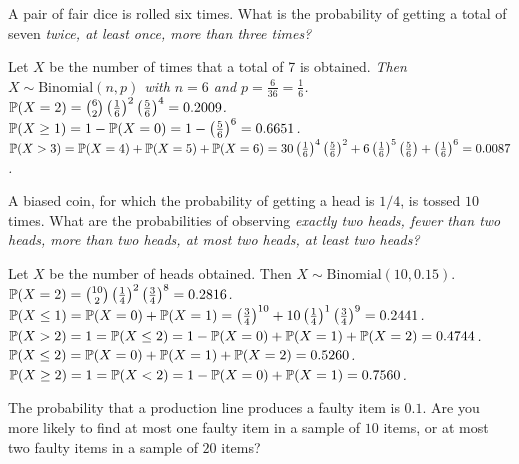 \begin{exercise}
\begin{questions}
\question
A pair of fair dice is rolled six times. What is the probability of getting a total of seven
\ben
\it twice,
\it at least once,
\it more than three times?
\een
\begin{answer}
Let $X$ be the number of times that a total of 7 is obtained. 
\bit
\it Then $X\sim\text{Binomial}(n,p)$ with $n=6$ and $p=\frac{6}{36}=\frac{1}{6}$.
\eit
\ben
\it $\mathbb{P}(X=2) 
	= \binom{6}{2}\left(\frac{1}{6}\right)^2 \left(\frac{5}{6}\right)^4 
	= 0.2009$.
\it $\mathbb{P}(X\geq 1) 
	= 1 - \mathbb{P}(X=0) 
	= 1 - \left(\frac{5}{6}\right)^6 
	= 0.6651$.
\it $\mathbb{P}(X>3)
	= \mathbb{P}(X=4) + \mathbb{P}(X=5) +\mathbb{P}(X=6)
	= 30\left(\frac{1}{6}\right)^4 \left(\frac{5}{6}\right)^2
		+ 6\left(\frac{1}{6}\right)^5 \left(\frac{5}{6}\right) 
		+ \left(\frac{1}{6}\right)^6 
	= 0.0087$.
\een
\end{answer}

\question
A biased coin, for which the probability of getting a head is $1/4$, is tossed $10$ times. What are the probabilities of observing
\ben
\it exactly two heads,
\it fewer than two heads,
\it more than two heads,
\it at most two heads, 
\it at least two heads?
\een
\begin{answer}
Let $X$ be the number of heads obtained. Then $X\sim\text{Binomial}(10,0.15)$. 
\ben
\it $\mathbb{P}(X=2) 
	= \binom{10}{2}\left(\frac{1}{4}\right)^2 \left(\frac{3}{4}\right)^8 
	= 0.2816$.
\it $\mathbb{P}(X\leq 1) 
	= \mathbb{P}(X=0) + \mathbb{P}(X=1) 
	= \left(\frac{3}{4}\right)^{10} + 10\left(\frac{1}{4}\right)^1 \left(\frac{3}{4}\right)^9 
	= 0.2441$.
\it $\mathbb{P}(X>2)
	= 1 = \mathbb{P}(X\leq 2)
	= 1 - \mathbb{P}(X=0) + \mathbb{P}(X=1) +\mathbb{P}(X=2)
	= 0.4744$.
\it $\mathbb{P}(X\leq 2)
	= \mathbb{P}(X=0) + \mathbb{P}(X=1) +\mathbb{P}(X=2)
	= 0.5260$.
\it $\mathbb{P}(X\geq 2)
	= 1 = \mathbb{P}(X<2)
	= 1 - \mathbb{P}(X=0) + \mathbb{P}(X=1)
	= 0.7560$.
\een
\end{answer}

\question
The probability that a production line produces a faulty item is $0.1$. Are you more likely to find at most one faulty item in a sample of $10$ items, or at most two faulty items in a sample of $20$ items?


\end{questions}
\end{exercise}

